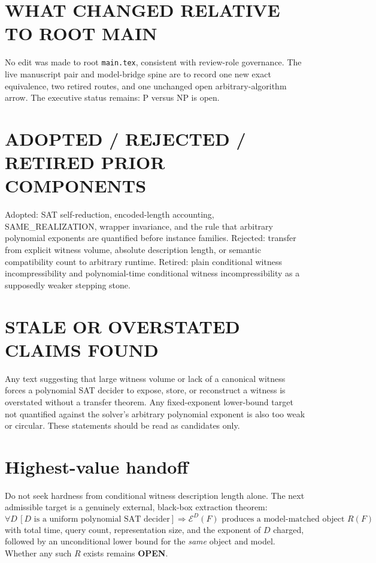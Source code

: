 \documentclass[11pt]{article}
\newcommand{\OPEN}{\textbf{OPEN}}
\begin{document}
\section{WHAT CHANGED RELATIVE TO ROOT MAIN}

No edit was made to root \texttt{main.tex}, consistent with review-role governance.  The live manuscript pair and model-bridge spine are to record one new exact equivalence, two retired routes, and one unchanged open arbitrary-algorithm arrow.  The executive status remains: P versus NP is open.

\section{ADOPTED / REJECTED / RETIRED PRIOR COMPONENTS}

Adopted: SAT self-reduction, encoded-length accounting, SAME\_REALIZATION, wrapper invariance, and the rule that arbitrary polynomial exponents are quantified before instance families.  Rejected: transfer from explicit witness volume, absolute description length, or semantic compatibility count to arbitrary runtime.  Retired: plain conditional witness incompressibility and polynomial-time conditional witness incompressibility as a supposedly weaker stepping stone.

\section{STALE OR OVERSTATED CLAIMS FOUND}

Any text suggesting that large witness volume or lack of a canonical witness forces a polynomial SAT decider to expose, store, or reconstruct a witness is overstated without a transfer theorem.  Any fixed-exponent lower-bound target not quantified against the solver's arbitrary polynomial exponent is also too weak or circular.  These statements should be read as candidates only.

\section{Highest-value handoff}

Do not seek hardness from conditional witness description length alone.  The next admissible target is a genuinely external, black-box extraction theorem:
\[
\forall D\,[D\text{ is a uniform polynomial SAT decider}]
\Longrightarrow
\mathcal E^D(F)\text{ produces a model-matched object }R(F)
\]
with total time, query count, representation size, and the exponent of $D$ charged, followed by an unconditional lower bound for the \emph{same} object and model.  Whether any such $R$ exists remains \OPEN.
\end{document}
